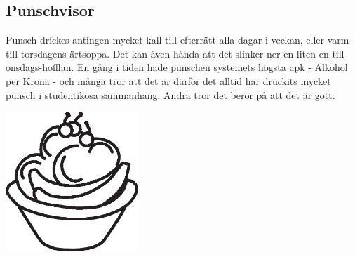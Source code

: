 \begin{flushleft}
\section{Punschvisor}
\Large{
Punsch drickes antingen mycket kall till efterrätt alla dagar i veckan,
eller varm till torsdagens ärtsoppa. Det kan även hända att det
slinker ner en liten en till onsdags-hofflan. En gång i tiden hade
punschen systemets högsta apk - Alkohol per Krona - och många tror att
det är därför det alltid har druckits mycket punsch i studentikosa
sammanhang. Andra tror det beror på att det är gott.}
\end{flushleft}

\vspace{2cm}
\begin{center}
\includegraphics[width=5cm]{bilder/punsch.eps}
\end{center}
\newpage

\newpage
{}
\newpage
{}
\newpage
{}
\newpage
{}
\newpage
{}
\newpage
{}
\newpage
{}
\newpage
{}
\newpage
{}
\newpage
{}
\newpage
{}
\newpage
{}
